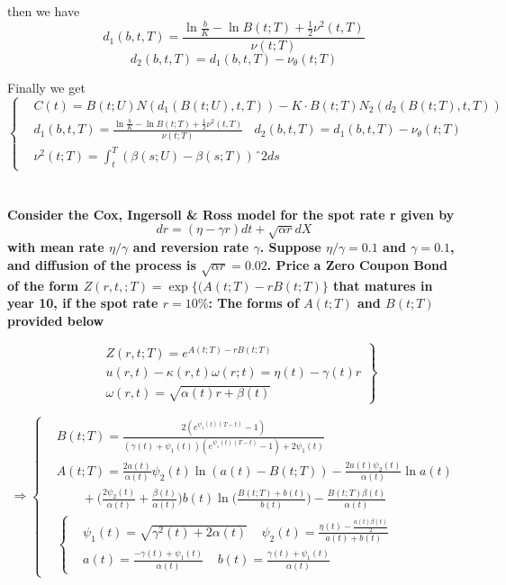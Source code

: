\documentclass[11pt, notitlepage]{article}
\def\\ln{\mathrm{\ln}}
\def\\exp{\mathrm{\exp}}
\def\\max{\mathrm{\max}}
\begin{document}
then we have
$$d_1(b,t,T) = \frac{\ln \frac{b}{K} - \ln B(t;T) + \frac{1}{2}\nu^2(t,T)}{\nu(t;T)}$$
$$d_2(b,t,T) = d_1(b,t,T)-\nu_\theta(t;T)$$

Finally we get
\begin{equation*}
\left \{
  \begin{aligned}
    &C(t) = B(t;U)N(d_1(B(t;U), t, T)) - K\cdot B(t;T)N_2(d_2(B(t;T), t,T))\\
    &d_1(b,t,T) = \frac{\ln \frac{b}{K} - \ln B(t;T) + \frac{1}{2}\nu^2(t,T)}{\nu(t;T)}  ~~~~d_2(b,t,T) = d_1(b,t,T)-\nu_\theta(t;T) \\
    &\nu^2(t;T) = \int_t^T (\beta(s;U) - \beta(s;T))ˆ2 ds
  \end{aligned} \right. 
\end{equation*}

\newpage
\section{}
\color{red}
\bfseries
Consider the Cox, Ingersoll \& Ross model for the spot rate r given by
$$ dr = (\eta - \gamma r) dt + \sqrt{\alpha r} dX$$
with mean rate $\eta/\gamma$ and reversion rate $\gamma$. Suppose $\eta/\gamma = 0.1$ and $\gamma = 0.1$, and diffusion of the process is $\sqrt{\alpha r} = 0.02$. Price a Zero Coupon Bond of the form $Z(r,t,;T) = \exp \{(A(t;T) - rB(t;T)\}$ that matures in year 10, if the spot rate $r= 10\%$: The forms of $A(t;T)$ and $B(t;T)$ provided below

\begin{equation*}
\left.
  \begin{aligned}
    &Z(r,t;T) = e^{A(t;T) - rB(t;T)}\\
    &u(r,t) - \kappa(r,t) \omega(r;t) = \eta(t) - \gamma(t) r\\
    &\omega(r,t) = \sqrt{\alpha(t)r + \beta(t)}
  \end{aligned} \right\}
\end{equation*}

\begin{equation*}
\Rightarrow \left \{
  \begin{aligned}
    &B(t;T)= \frac{2(e^{\psi_1 (t)(T-t)}-1)}{(\gamma(t) +\psi_1(t))(e^{\psi_1(t)(T-t)}-1)+2\psi_1(t)}\\
    &A(t;T) = \frac{2a(t)}{\alpha(t)}\psi_2(t) \ln(a(t)-B(t;T)) - \frac{2a(t)\psi_2(t)}{\alpha(t)}\ln a(t)\\
    & ~~~~~~~~~ +\bigg(\frac{2\psi _2(t)}{\alpha(t)} + \frac{\beta(t)}{\alpha(t)}\bigg) b(t) \ln \bigg(\frac{B(t;T) + b(t)}{b(t)} \bigg) - \frac{B(t;T)\beta(t)}{\alpha (t)}\\
    & \left \{ 
    \begin{aligned}
    &\psi_1(t) = \sqrt{\gamma^2(t) + 2\alpha(t)} ~~~~~ \psi_2(t) = \frac{\eta(t) - \frac{a(t)\beta(t)}{2}}{a(t) + b(t)}\\
    &a(t) = \frac{-\gamma(t) + \psi_1(t)}{\alpha(t)} ~~~~~b(t) = \frac{\gamma(t) + \psi_1(t)}{\alpha(t)}
    \end{aligned} \right.
  \end{aligned} \right. 
\end{equation*}
\mdseries
\end{document}
